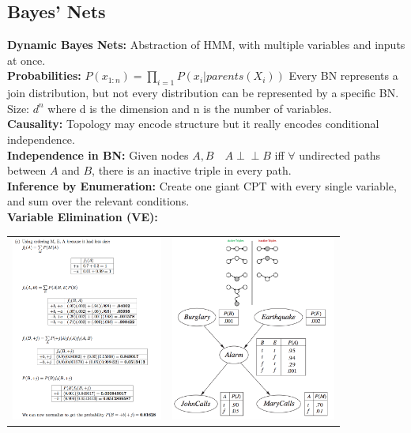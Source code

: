 \documentclass[10pt, a4paper]{article}
\begin{document}
\begin{multicols*}{1}
        \section*{Bayes' Nets}
            \textbf{Dynamic Bayes Nets:} Abstraction of HMM, with multiple variables and inputs at once.\\
            \textbf{Probabilities:} $P(x_{1:n}) = \prod_{i=1} P(x_i | parents(X_i))$ Every BN represents a join distribution, but not every distribution can be represented by a specific BN. Size: $d^n$ where d is the dimension and n is the number of variables.\\
            \textbf{Causality:} Topology may encode structure but it really encodes conditional independence.\\
            \textbf{Independence in BN:} Given nodes $A,B\quad A \!\perp\!\!\!\perp\! B$ iff $\forall$ undirected paths between $A$ and $B$, there is an inactive triple in every path.\\
            \textbf{Inference by Enumeration:} Create one giant CPT with every single variable, and sum over the relevant conditions.\\
            \textbf{Variable Elimination (VE):} \\
            \begin{tabular}{l|c}
            \includegraphics[height=230px]{VE.png} &  \includegraphics[height=230px]{graph2.png} \\

\end{tabular}
\end{multicols*}
\end{document}
